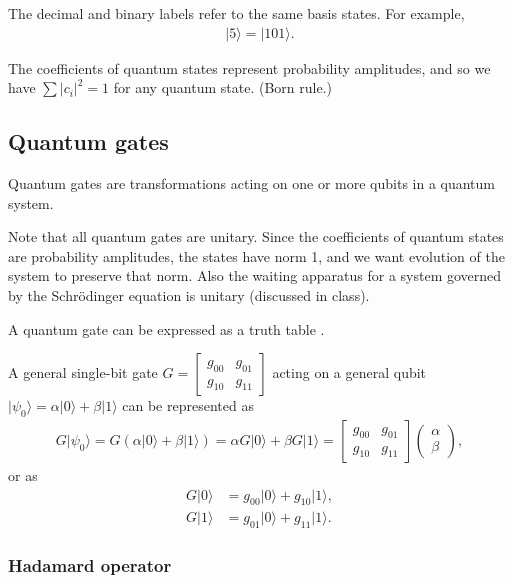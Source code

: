 \documentclass[11pt]{article}
\begin{document}
The decimal and binary labels refer to the same basis states. For example,
\begin{align*}
\lvert 5\rangle = \lvert 101\rangle.
\end{align*}

The coefficients of quantum states represent probability amplitudes, and so we have $\sum |c_i|^2 = 1$ for any quantum state. (Born rule.)

\subsection{Quantum gates}

Quantum gates are transformations acting on one or more qubits in a quantum system.

Note that all quantum gates are unitary. Since the coefficients of quantum states are probability amplitudes, the states have norm 1, and we want evolution of the system to preserve that norm. Also the waiting apparatus for a system governed by the Schr\"odinger equation is unitary (discussed in class).

A quantum gate can be expressed as a truth table \cite{Shor_1997}.

A general single-bit gate $G = \begin{bmatrix} g_{00} & g_{01} \\ g_{10} & g_{11} \end{bmatrix}$ acting on a general qubit $\vert \psi_0 \rangle = \alpha \vert 0 \rangle + \beta \vert 1 \rangle$ can be represented as
\begin{align*}
G \vert \psi_0 \rangle
= G(\alpha \vert 0 \rangle + \beta \vert 1 \rangle)
= \alpha G \vert 0 \rangle + \beta G \vert 1 \rangle
= \begin{bmatrix} g_{00} & g_{01} \\ g_{10} & g_{11} \end{bmatrix}
\begin{pmatrix} \alpha \\ \beta \end{pmatrix},
\end{align*}
or as
\begin{align*}
G \vert 0 \rangle &= g_{00}\vert 0 \rangle + g_{10}\vert 1 \rangle,\\
G \vert 1 \rangle &= g_{01}\vert 0 \rangle + g_{11}\vert 1 \rangle.
\end{align*}

\subsubsection{Hadamard operator}
\end{document}

